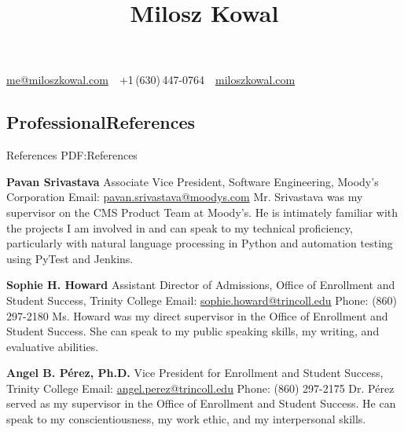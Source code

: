 \documentclass[letterpaper,10pt,oneside]{article}
\newcommand{\CVAuthor}{Milosz Kowal}
\newcommand{\CVWebpage}{https://miloszkowal.com}
\begin{document}

\title{\CVAuthor}

\begin{subtitle}
\begin{comment}
\end{comment}
\href{mailto:me@miloszkowal.com}
{me@miloszkowal.com}
\,\SubBulletSymbol\,
+1\,(630)\,447-0764
\,\SubBulletSymbol\,
\href{\CVWebpage}
{miloszkowal.com}
\end{subtitle}

\begin{body}



\section
{Professional\newline References}
{References}
{PDF:References}

{\textbf{Pavan Srivastava}}
\hfill
\GapNoBreak
\BulletItem
Associate Vice President, Software Engineering, Moody's Corporation
\BulletItem
Email: \href{mailto:ManMei.Wong@moodys.com}{pavan.srivastava@moodys.com}
\BulletItem
Mr. Srivastava was my supervisor on the CMS Product Team at Moody's. He is intimately familiar with the projects I am involved in and can speak to my technical proficiency, particularly with natural language processing in Python and automation testing using PyTest and Jenkins.

\BigGapNoBreak

{\textbf{Sophie H. Howard}}
\hfill
\GapNoBreak
\BulletItem
Assistant Director of Admissions, Office of Enrollment and Student Success, Trinity College
\BulletItem
Email: \href{mailto:sophie.howard@trincoll.edu}{sophie.howard@trincoll.edu}
\BulletItem
Phone: (860) 297-2180
\BulletItem
Ms. Howard was my direct supervisor in the Office of Enrollment and Student Success. She can speak to my public speaking skills, my writing, and evaluative abilities.

\BigGapNoBreak

{\textbf{Angel B. Pérez, Ph.D.}}
\hfill
\GapNoBreak
\BulletItem
Vice President for Enrollment and Student Success, Trinity College
\BulletItem
Email: \href{mailto:angel.perez@trincoll.edu}{angel.perez@trincoll.edu}
\BulletItem
Phone: (860) 297-2175
\BulletItem
Dr. Pérez served as my supervisor in the Office of Enrollment and Student Success. He can speak to my conscientiousness, my work ethic, and my interpersonal skills.


\end{body}
\end{document}
